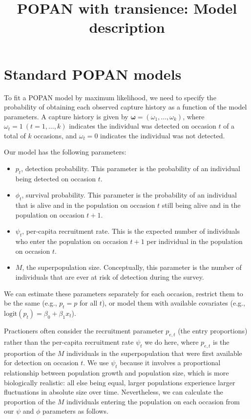 \documentclass{article}
\title{POPAN with transience: Model description}
\author{}
\date{}
\begin{document}
\maketitle

\section{Standard POPAN models}

To fit a POPAN model by maximum likelihood, we need to specify the
probability of obtaining each observed capture history as a function
of the model parameters. A capture history is given by $\bm{\omega} =
(\omega_1, \ldots, \omega_k)$, where $\omega_t = 1\ (t = 1, \ldots,
k)$ indicates the individual was detected on occasion $t$ of a total
of $k$ occasions, and $\omega_t = 0$ indicates the individual was not
detected.

Our model has the following parameters:
\begin{itemize}
  \item $p_t$, detection probability. This parameter is the
    probability of an individual being detected on occasion $t$.
  \item $\phi_t$, survival probability. This parameter is the
    probability of an individual that is alive and in the population
    on occasion $t$ still being alive and in the population on
    occasion $t + 1$.
  \item $\psi_t$, per-capita recruitment rate. This is the expected
    number of individuals who enter the population on occasion $t +
    1$ per individual in the population on occasion $t$.
  \item $M$, the superpopulation size. Conceptually, this parameter is
    the number of individuals that are ever at risk of detection
    during the survey.
\end{itemize}
We can estimate these parameters separately for each occasion,
restrict them to be the same (e.g., $p_t = p$ for all $t$), or model
them with available covariates (e.g., $\mathrm{logit}(p_t) = \beta_0 +
\beta_1 x_t$).

Practioners often consider the recruitment parameter $p_{e, t}$ (the
entry proportions) rather than the per-capita recruitment rate
$\psi_t$ we do here, where $p_{e, t}$ is the proportion of the $M$
individuals in the superpopulation that were first available for
detection on occasion $t$. We use $\psi_t$ because it involves a
proportional relationship between population growth and population
size, which is more biologically realistic: all else being equal,
larger populations experience larger fluctuations in absolute size
over time. Nevertheless, we can calculate the proportion of the $M$
individuals entering the population on each occasion from our $\psi$
and $\phi$ parameters as follows.
\end{document}
